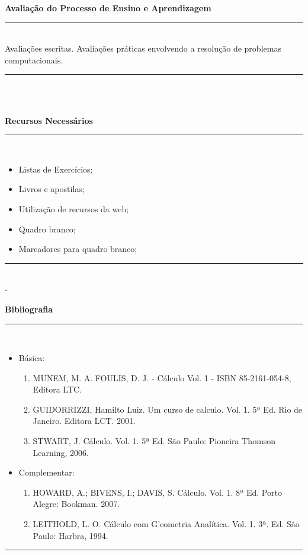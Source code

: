 \begin{center}\textbf{Avaliação do Processo de Ensino e Aprendizagem}\end{center}
\vspace{-5mm}
\noindent\rule{16.5cm}{0.4pt}
\\
   Avaliações escritas. Avaliações práticas envolvendo a resolução de problemas computacionais.\\
\noindent\rule{16.5cm}{0.4pt}\\
\\
\vspace{-12mm}
\begin{center}\textbf{Recursos Necessários}\end{center}
\vspace{-5mm}
\noindent\rule{16.5cm}{0.4pt}
\\
\begin{itemize} 
  \item Listas de Exercícios;
  \item Livros e apostilas;
  \item Utilização de recursos da web;
  \item Quadro branco;
  \item Marcadores para quadro branco;
\end{itemize}
\noindent\rule{16.5cm}{0.4pt}\\ - 
\\
\vspace{-12mm}
\begin{center}\textbf{Bibliografia}\end{center}
\vspace{-5mm}
\noindent\rule{16.5cm}{0.4pt}
\\
\begin{itemize} 
  \item Básica:
	\begin{enumerate}
	\item MUNEM, M. A. FOULIS, D. J. - Cálculo Vol. 1 - ISBN  85-2161-054-8, Editora LTC.
	\item GUIDORRIZZI, Hamilto Luiz. Um curso de calculo. Vol. 1. 5ª Ed. Rio de Janeiro. Editora LCT. 2001.
	\item STWART, J. Cálculo. Vol. 1. 5ª Ed. São Paulo: Pioneira Thomson Learning, 2006.
	\end{enumerate}
  \item Complementar:
	\begin{enumerate} 
	\item  HOWARD, A.; BIVENS, I.; DAVIS, S. Cálculo. Vol. 1. 8ª Ed. Porto Alegre: Bookman.  2007.
	\item  LEITHOLD, L. O. Cálculo com G'eometria Analítica. Vol. 1. 3ª. Ed. São Paulo: Harbra, 1994.
	\end{enumerate}
\end{itemize}
\noindent\rule{16.5cm}{0.4pt}\\
\\

